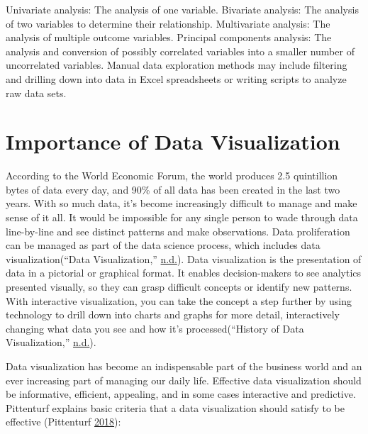 \documentclass[]{book}
\begin{document}
Univariate analysis: The analysis of one variable.
Bivariate analysis: The analysis of two variables to determine their relationship.
Multivariate analysis: The analysis of multiple outcome variables.
Principal components analysis: The analysis and conversion of possibly correlated variables into a smaller number of uncorrelated variables.
Manual data exploration methods may include filtering and drilling down into data in Excel spreadsheets or writing scripts to analyze raw data sets.

\hypertarget{importance-of-data-visualization}{%
\section{Importance of Data Visualization}\label{importance-of-data-visualization}}

According to the World Economic Forum, the world produces 2.5 quintillion bytes of data every day, and 90\% of all data has been created in the last two years. With so much data, it's become increasingly difficult to manage and make sense of it all. It would be impossible for any single person to wade through data line-by-line and see distinct patterns and make observations. Data proliferation can be managed as part of the data science process, which includes data visualization(``Data Visualization,'' \protect\hyperlink{ref-data_viz_importance1}{n.d.}). Data visualization is the presentation of data in a pictorial or graphical format. It enables decision-makers to see analytics presented visually, so they can grasp difficult concepts or identify new patterns. With interactive visualization, you can take the concept a step further by using technology to drill down into charts and graphs for more detail, interactively changing what data you see and how it's processed(``History of Data Visualization,'' \protect\hyperlink{ref-data_viz_importance2}{n.d.}).

Data visualization has become an indispensable part of the business world and an ever increasing part of managing our daily life. Effective data visualization should be informative, efficient, appealing, and in some cases interactive and predictive. Pittenturf explains basic criteria that a data visualization should satisfy to be effective (Pittenturf \protect\hyperlink{ref-viz_importance}{2018}):
\end{document}
